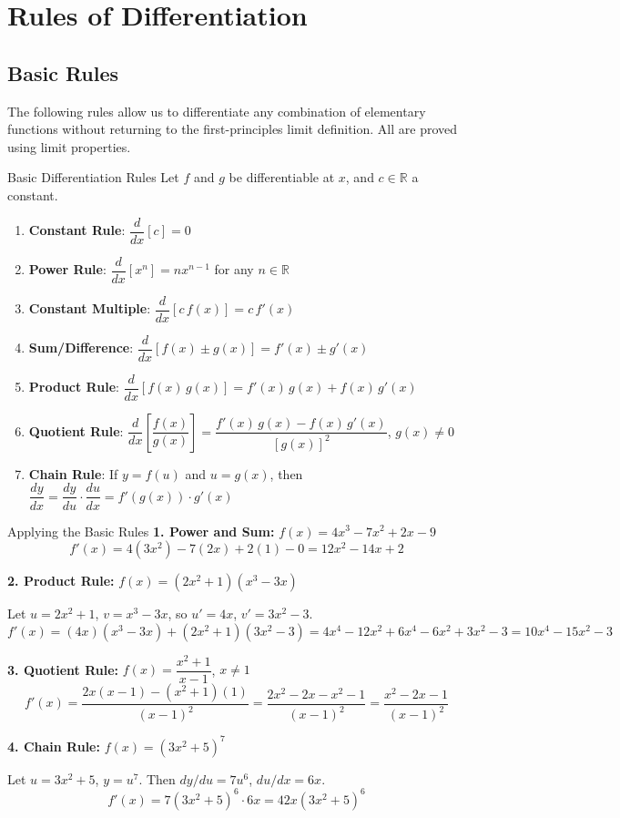 \documentclass[12pt, a4paper]{article}
\theoremstyle{definition}
\newcommand{\R}{\mathbb{R}}
\newcommand{\dd}[1]{\dfrac{d}{d#1}}
\newcommand{\ddd}[2]{\dfrac{d#1}{d#2}}
\begin{document}
\section{Rules of Differentiation}

\subsection{Basic Rules}

The following rules allow us to differentiate any combination of elementary
functions without returning to the first-principles limit definition.  All are
proved using limit properties.

\begin{thmbox}{Basic Differentiation Rules}
Let $f$ and $g$ be differentiable at $x$, and $c \in \R$ a constant.
\begin{enumerate}
  \item \textbf{Constant Rule}: $\dd{x}[c] = 0$
  \item \textbf{Power Rule}: $\dd{x}[x^n] = nx^{n-1}$ for any $n \in \R$
  \item \textbf{Constant Multiple}: $\dd{x}[c\,f(x)] = c\,f'(x)$
  \item \textbf{Sum/Difference}: $\dd{x}[f(x)\pm g(x)] = f'(x)\pm g'(x)$
  \item \textbf{Product Rule}: $\dd{x}[f(x)\,g(x)] = f'(x)\,g(x) + f(x)\,g'(x)$
  \item \textbf{Quotient Rule}:
    $\dd{x}\!\left[\dfrac{f(x)}{g(x)}\right]
    = \dfrac{f'(x)\,g(x) - f(x)\,g'(x)}{[g(x)]^2}$, \; $g(x)\neq 0$
  \item \textbf{Chain Rule}: If $y = f(u)$ and $u = g(x)$, then
    $\ddd{y}{x} = \ddd{y}{u}\cdot\ddd{u}{x} = f'(g(x))\cdot g'(x)$
\end{enumerate}
\end{thmbox}

\begin{exbox}{Applying the Basic Rules}
\textbf{1. Power and Sum:} $f(x) = 4x^3 - 7x^2 + 2x - 9$
\[
  f'(x) = 4(3x^2) - 7(2x) + 2(1) - 0 = 12x^2 - 14x + 2
\]

\textbf{2. Product Rule:} $f(x) = (2x^2+1)(x^3-3x)$

Let $u = 2x^2+1$, $v = x^3-3x$, so $u'=4x$, $v'=3x^2-3$.
\[
  f'(x) = (4x)(x^3-3x) + (2x^2+1)(3x^2-3)
        = 4x^4 - 12x^2 + 6x^4 - 6x^2 + 3x^2 - 3
        = 10x^4 - 15x^2 - 3
\]

\textbf{3. Quotient Rule:} $f(x) = \dfrac{x^2+1}{x-1}$, $x\neq 1$
\[
  f'(x) = \frac{2x(x-1) - (x^2+1)(1)}{(x-1)^2}
        = \frac{2x^2-2x-x^2-1}{(x-1)^2}
        = \frac{x^2-2x-1}{(x-1)^2}
\]

\textbf{4. Chain Rule:} $f(x) = (3x^2+5)^7$

Let $u = 3x^2+5$, $y = u^7$. Then $dy/du = 7u^6$, $du/dx = 6x$.
\[
  f'(x) = 7(3x^2+5)^6 \cdot 6x = 42x(3x^2+5)^6
\]
\end{exbox}
\end{document}
